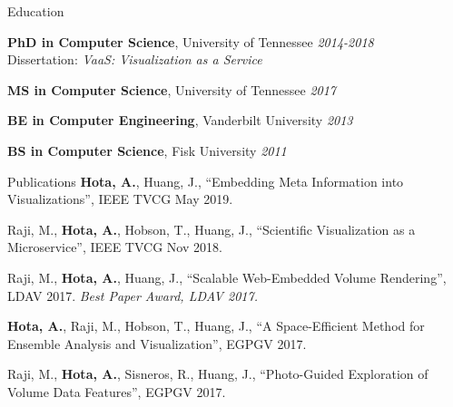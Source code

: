 \documentclass{resume} %
\begin{document}

\begin{rSection}{Education}

{{\bf PhD in Computer Science}, University of Tennessee} \hfill {\em 2014-2018} \\ 
Dissertation: \emph{VaaS: Visualization as a Service}

{{\bf MS in Computer Science}, University of Tennessee} \hfill {\em 2017}

{{\bf BE in Computer Engineering}, Vanderbilt University} \hfill {\em 2013}

{{\bf BS in Computer Science}, Fisk University} \hfill {\em 2011}

\end{rSection}


\begin{rSection}{Publications}
  \textbf{Hota, A.}, Huang, J., ``Embedding Meta Information into Visualizations'', IEEE TVCG May 2019. \href{https://doi.org/10.1109/TVCG.2019.2916098}{\faLink}

    Raji, M., \textbf{Hota, A.}, Hobson, T., Huang, J., ``Scientific Visualization as a Microservice'', IEEE TVCG Nov 2018. \href{https://doi.org/10.1109/TVCG.2018.2879672}{\faLink}

    Raji, M., \textbf{Hota, A.}, Huang, J., ``Scalable Web-Embedded Volume Rendering'', LDAV 2017.
    \textit{Best Paper Award, LDAV 2017.} \href{http://web.eecs.utk.edu/~ahota/pdfs/tapestry-ldav-2017.pdf}{\faFilePdfO}
    
    \textbf{Hota, A.}, Raji, M., Hobson, T., Huang, J., ``A Space-Efficient Method for Ensemble Analysis and Visualization'', EGPGV 2017. \href{http://web.eecs.utk.edu/~ahota/pdfs/nea-egpgv-2017.pdf}{\faFilePdfO}
    
    Raji, M., \textbf{Hota, A.}, Sisneros, R., Huang, J., ``Photo-Guided Exploration of Volume Data Features'', EGPGV 2017. \href{http://web.eecs.utk.edu/~ahota/pdfs/photoguided-egpgv-2017.pdf}{\faFilePdfO}
\end{rSection}

\end{document}
